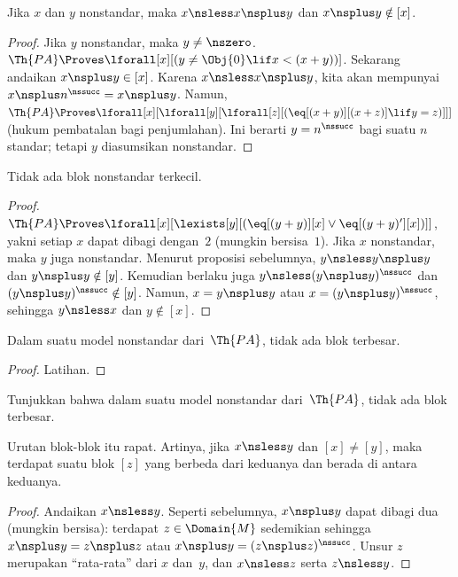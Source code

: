 \documentclass[../../../include/open-logic-section]{subfiles}
\begin{document}
\begin{prop}
Jika $x$ dan $y$ nonstandar, maka $x \nsless x \nsplus y$ dan
$x \nsplus y \notin [x]$.
\end{prop}

\begin{proof}
Jika $y$ nonstandar, maka $y \neq \nszero$. $\Th{PA} \Proves
\lforall[x][(y \neq \Obj{0} \lif x < (x+y))]$. Sekarang andaikan
$x \nsplus y \in [x]$. Karena $x \nsless x \nsplus y$, kita akan mempunyai
$x \nsplus n^\nssucc = x \nsplus y$. Namun,
$\Th{PA} \Proves \lforall[x][\lforall[y][\lforall[z][(\eq[(x+y)][(x+z)]
\lif y = z)]]]$ (hukum pembatalan bagi penjumlahan). Ini berarti
$y = n^\nssucc$ bagi suatu $n$ standar; tetapi $y$ diasumsikan nonstandar.
\end{proof}

\begin{prop}
Tidak ada blok nonstandar terkecil.
\end{prop}

\begin{proof}
$\Th{PA} \Proves \lforall[x][\lexists[y][(\eq[(y+y)][x] \lor
      \eq[(y+y)'][x])]]$, yakni setiap $x$ dapat dibagi dengan~$2$ (mungkin
bersisa~$1$). Jika $x$ nonstandar, maka $y$ juga nonstandar. Menurut proposisi
sebelumnya, $y \nsless y \nsplus y$ dan $y \nsplus y \notin [y]$.
Kemudian berlaku juga $y \nsless (y \nsplus y)^\nssucc$ dan
$(y \nsplus y)^\nssucc \notin [y]$. Namun,
$x = y \nsplus y$ atau $x = (y \nsplus y)^\nssucc$, sehingga
$y \nsless x$ dan $y \notin [x]$.
\end{proof}

\begin{prop}
Dalam suatu model nonstandar dari~$\Th{PA}$, tidak ada blok terbesar.
\end{prop}

\begin{proof}
Latihan.
\end{proof}

\begin{prob}
Tunjukkan bahwa dalam suatu model nonstandar dari~$\Th{PA}$, tidak ada blok
terbesar.
\end{prob}

\begin{prop}
Urutan blok-blok itu rapat. Artinya, jika $x \nsless y$ dan
$[x] \neq [y]$, maka terdapat suatu blok $[z]$ yang berbeda dari keduanya dan
berada di antara keduanya.
\end{prop}

\begin{proof}
Andaikan $x \nsless y$. Seperti sebelumnya, $x \nsplus y$ dapat dibagi dua
(mungkin bersisa): terdapat $z \in \Domain{M}$ sedemikian sehingga
$x \nsplus y = z \nsplus z$ atau
$x \nsplus y = (z \nsplus z)^\nssucc$. Unsur $z$ merupakan ``rata-rata''
dari $x$ dan~$y$, dan $x \nsless z$ serta $z \nsless y$.
\end{proof}
\end{document}

